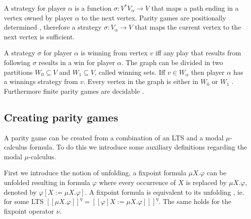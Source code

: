 A strategy for player $\alpha$ is a function $\sigma : V^*V_\alpha \rightarrow V$ that maps a path ending in a vertex owned by player $\alpha$ to the next vertex. Parity games are positionally determined \cite{Bradfield2018}, therefore a strategy $\sigma: V_\alpha \rightarrow V$ that maps the current vertex to the next vertex is sufficient. 

A strategy $\sigma$ for player $\alpha$ is winning from vertex $v$ iff any play that results from following $\sigma$ results in a win for player $\alpha$. The graph can be divided in two partitions $W_0 \subseteq V$ and $W_1 \subseteq V$, called winning sets. Iff $v \in W_\alpha$ then player $\alpha$ has a winnings strategy from $v$. Every vertex in the graph is either in $W_0$ or $W_1$ \cite{Bradfield2018}. Furthermore finite parity games are decidable \cite{Bradfield2018}.


\subsection{Creating parity games}
A parity game can be created from a combination of an LTS and a modal $\mu$-calculus formula. To do this we introduce some auxiliary definitions regarding the modal $\mu$-calculus.

First we introduce the notion of unfolding, a fixpoint formula $\mu X . \varphi$ can be unfolded resulting in formula $\varphi$ where every occurrence of $X$ is replaced by $\mu X . \varphi$, denoted by $\varphi [ X:= \mu X . \varphi]$. A fixpoint formula is equivalent to its unfolding \cite{Bradfield2018}, ie. for some LTS $[\![\mu X . \varphi]\!]^\eta = [\![\varphi[X:=\mu X . \varphi]]\!]^\eta$. The same holds for the fixpoint operator $\nu$.

